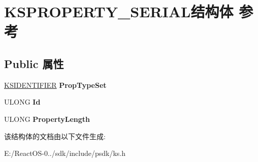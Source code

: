 \hypertarget{struct_k_s_p_r_o_p_e_r_t_y___s_e_r_i_a_l}{}\section{K\+S\+P\+R\+O\+P\+E\+R\+T\+Y\+\_\+\+S\+E\+R\+I\+A\+L结构体 参考}
\label{struct_k_s_p_r_o_p_e_r_t_y___s_e_r_i_a_l}
\subsection*{Public 属性}
\begin{DoxyCompactItemize}
\item 
\mbox{\label{struct_k_s_p_r_o_p_e_r_t_y___s_e_r_i_a_l_ad0928d5b4c3338dd7d134aa3b4b4f79e}} 
\hyperlink{struct_k_s_i_d_e_n_t_i_f_i_e_r}{K\+S\+I\+D\+E\+N\+T\+I\+F\+I\+ER} {\bfseries Prop\+Type\+Set}
\item 
\mbox{\label{struct_k_s_p_r_o_p_e_r_t_y___s_e_r_i_a_l_adc889d39fd9d33a11e0b9e861097a9de}} 
U\+L\+O\+NG {\bfseries Id}
\item 
\mbox{\label{struct_k_s_p_r_o_p_e_r_t_y___s_e_r_i_a_l_a866564670e9e54eaaa898db8b938123f}} 
U\+L\+O\+NG {\bfseries Property\+Length}
\end{DoxyCompactItemize}


该结构体的文档由以下文件生成\+:\begin{DoxyCompactItemize}
\item 
E\+:/\+React\+O\+S-\/0../sdk/include/psdk/ks.\+h\end{DoxyCompactItemize}
